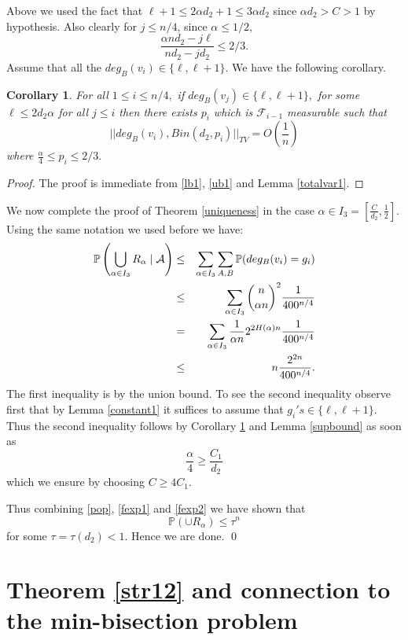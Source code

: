 \documentclass[11pt,reqno]{amsart}
\newtheorem{corollary}{Corollary}
\begin{document}
Above we used the fact that  $\ell+1 \le 2\alpha d_2+1\le 3\alpha d_2$ since $\alpha d_2>C>1$ by hypothesis. 
Also clearly for $j\le n/4$,  since $\alpha\le 1/2,$
\begin{equation}\label{ub1}
\frac{\alpha nd_2-j\ell}{nd_2-jd_2}\le 2/3.
\end{equation}
Assume that all the $deg_{B}(v_i)\in \{\ell,\ell+1\}.$ We have the following corollary.
\begin{corollary}\label{binomapprox}For all $1\le i\le n/4,$ if $deg_{B}(v_j)\in \{\ell,\ell+1\},$ for some $\ell \le 2d_2 \alpha$  for all $j\le i$ then there exists $p_{i}$ which is $\mathcal{F}_{i-1}$ measurable such that $$||deg_{B}(v_i),Bin(d_2,p_{i})||_{TV}= O\left(\frac{1}{n}\right)$$  where $\frac{\alpha}{4} \le p_{i}\le 2/3.$
\end{corollary}
\begin{proof}The proof is immediate from \eqref{lb1}, \eqref{ub1} and Lemma \ref{totalvar1}. 
\end{proof} 
We now complete the proof of Theorem \ref{uniqueness} in the case $\alpha\in I_3=[\frac{C}{d_2},\frac{1}{2}].$
Using the same notation we used before we have:
\begin{eqnarray}
\nonumber
\mathbb{P}\left(\bigcup_{\alpha\in I_3}R_{\alpha}\mid \mathcal{A}\right) & \le & \sum_{\alpha\in I_3}\sum_{A,B}\mathbb{P}(deg_B(v_i)=g_i)\\
\nonumber
& \le &\sum_{\alpha\in I_3} \binom{n}{\alpha n}^2 \frac{1}{400^{n/4}}\\
\nonumber
& = &\sum_{\alpha\in I_3} \frac{1}{{\alpha n}}2^{2H(\alpha)n}\frac{1}{400^{n/4}}\\
& \leq & n\frac{2^{2n}}{400^{n/4}}. \label{fexp2}
\end{eqnarray}
The first inequality is by the union bound. To see the second inequality observe first that by Lemma \ref{constant1} it suffices to assume that $g_i's \in \{\ell,\ell+1\}$. Thus the second inequality follows by Corollary \ref{binomapprox} and Lemma \ref{supbound} as soon as $$\frac{\alpha}{4}\ge \frac{C_1}{d_2}$$ which we ensure by choosing $C\ge 4C_1.$  

Thus combining \eqref{pop}, \eqref{fexp1} and \eqref{fexp2} we have shown that 
$$\mathbb{P}(\cup R_{\alpha}) \le \tau^{n}$$ for some $\tau=\tau(d_2)<1.$  
Hence we are done. 
\qed

\section{Theorem \ref{str12} and connection to the min-bisection problem}\label{sec_weak}
\end{document}
